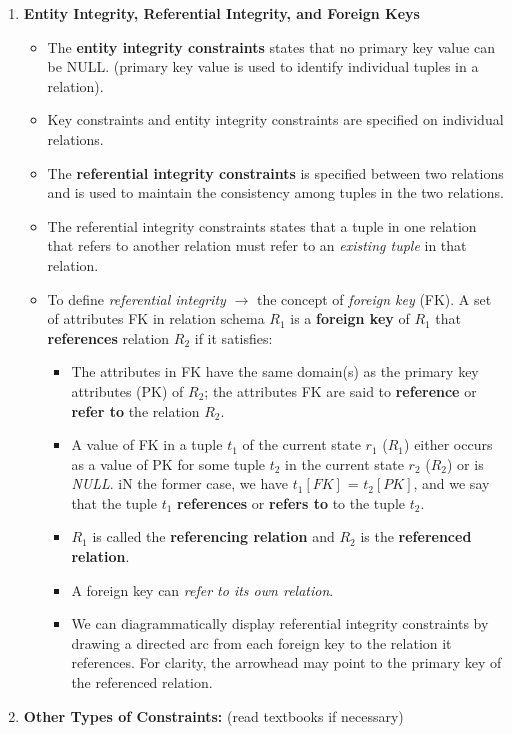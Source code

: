 \documentclass[10pt]{article}
\newcommand{\tf}{\textbf}
\newcommand{\ti}{\textit}
\begin{document}
\begin{enumerate}
	\item \tf{Entity Integrity, Referential Integrity, and Foreign Keys}
	\begin{itemize}
		\item The \tf{entity integrity constraints} states that no primary key value can be NULL. (primary key value is used to identify individual tuples in a relation).
		\item Key constraints and entity integrity constraints are specified on individual relations.
		\item The \tf{referential integrity constraints} is specified between two relations and is used to maintain the consistency among tuples in the two relations.
		\item The referential integrity constraints states that a tuple in one relation that refers to another relation must refer to an \ti{existing tuple} in that relation.
		\item To define \ti{referential integrity} $\rightarrow$ the concept of \ti{foreign key} (FK). A set of attributes FK in relation schema $R_1$ is a \tf{foreign key} of $R_1$ that \tf{references} relation $R_2$ if it satisfies:
		\begin{itemize}
			\item The attributes in FK have the same domain(s) as the primary key attributes (PK) of $R_2$; the attributes FK are said to \tf{reference} or \tf{refer to} the relation $R_2$.
			\item A value of FK in a tuple $t_1$ of the current state $r_1$ ($R_1$) either occurs as a value of PK for some tuple $t_2$ in the current state $r_2$ ($R_2$) or is \ti{NULL}. iN the former case, we have $t_1[FK]$ = $t_2[PK]$, and we say that the tuple $t_1$ \tf{references} or \tf{refers to} to the tuple $t_2$.
			\item $R_1$ is called the \tf{referencing relation} and $R_2$ is the \tf{referenced relation}.
			\item A foreign key can \ti{refer to its own relation}.
			\item We can diagrammatically display referential integrity constraints by drawing a directed arc from each foreign key to the relation it references. For clarity, the arrowhead may point to the primary key of the referenced relation.
		\end{itemize}   
	\end{itemize}

	\item \tf{Other Types of Constraints: }
	(read textbooks if necessary)
\end{enumerate}
\end{document}
